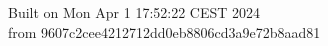 {\noindent Built on Mon Apr  1 17:52:22 CEST 2024} \\ 
 {\noindent from 9607c2cee4212712dd0eb8806cd3a9e72b8aad81}
